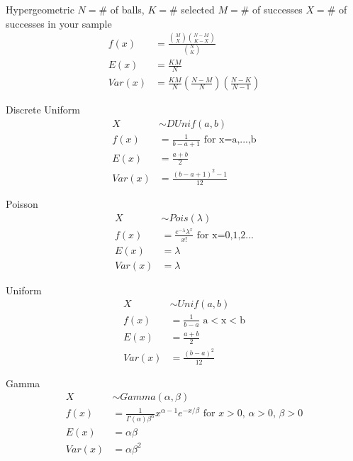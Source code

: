 \documentclass[avery5388,grid,frame]{flashcards}
\begin{document}
\begin{flashcard}[Distribution]{Hypergeometric}
\bigskip\bigskip\bigskip
$N=\#$ of balls, $K=\#$ selected $M=\#$ of successes $X=\#$ of successes in your sample
{\begin{align*}
f(x)&=\frac{{M\choose X}{N-M\choose K-X}}{{N\choose K}}\\
E(x)&=\frac{KM}{N}\\
Var(x)&=\frac{KM}{N}\left(\frac{N-M}{N}\right)\left(\frac{N-K}{N-1}\right)
\end{align*}}
\end{flashcard}
\begin{flashcard}[Distribution]{Discrete Uniform}
\bigskip\bigskip\bigskip
{\begin{align*}
X&\sim DUnif(a,b)\\
f(x)&=\frac{1}{b-a+1} \textrm{ for x=a,...,b}\\
E(x)&=\frac{a+b}{2}\\
Var(x)&=\frac{(b-a+1)^2-1}{12}
\end{align*}}
\end{flashcard}
\begin{flashcard}[Distribution]{Poisson}
\bigskip\bigskip\bigskip
{\begin{align*}
X&\sim Pois(\lambda)\\
f(x)&=\frac{e^{-\lambda}\lambda^x}{x!}\textrm{  for x=0,1,2...}\\
E(x)&=\lambda\\
Var(x)&=\lambda
\end{align*}}
\end{flashcard}
\begin{flashcard}[Distribution]{Uniform}
\bigskip\bigskip\bigskip
{\begin{align*}
X&\sim Unif(a,b)\\
f(x)&=\frac{1}{b-a}\textrm{  a$<$x$<$b}\\
E(x)&=\frac{a+b}{2}\\
Var(x)&=\frac{(b-a)^2}{12}
\end{align*}}
\end{flashcard}
\begin{flashcard}[Distribution]{Gamma}
\bigskip\bigskip\bigskip
{\begin{align*}
X&\sim Gamma(\alpha,\beta)\\
f(x)&=\frac{1}{\Gamma(\alpha)\beta^\alpha}x^{\alpha-1}e^{-x/\beta}\textrm{  for $x>0$, $\alpha>0$, $\beta>0$}\\
E(x)&=\alpha\beta\\
Var(x)&=\alpha\beta^2
\end{align*}}
\end{flashcard}
\end{document}
